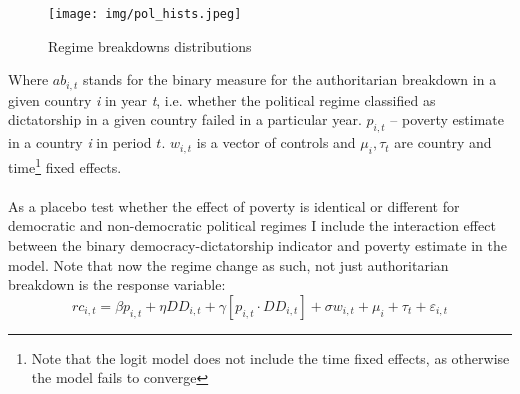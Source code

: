 \documentclass[a4paper, 12pt]{article}
\begin{document}
	\begin{figure}
        \centering
        \texttt{[image: img/pol\_hists.jpeg]}
        \caption{Regime breakdowns distributions}
        \label{fig:pol_hists}
    \end{figure}
	
	\noindent Where $ab_{i,t}$ stands for the binary measure for the authoritarian breakdown in a given country \textit{i} in year \textit{t}, i.e. whether the political regime classified as dictatorship in a given country failed in a particular year. $p_{i,t}$ -- poverty estimate in a country \textit{i} in period $t$. $w_{i,t}$ is a vector of controls and $\mu_i, \tau_t$ are country and time\footnote{Note that the logit model does not include the time fixed effects, as otherwise the model fails to converge} fixed effects.
	\\\\
	\noindent As a placebo test whether the effect of poverty is identical or different for democratic and non-democratic political regimes I include the interaction effect between the binary democracy-dictatorship indicator and poverty estimate in the model. Note that now the regime change as such, not just authoritarian breakdown is the response variable:
	\begin{equation}\label{lpmchange}
	    rc_{i,t} = \beta p_{i,t} + \eta DD_{i,t} + \gamma [p_{i,t} \cdot DD_{i,t}] + \sigma w_{i,t}+\mu_i+\tau_t +\varepsilon_{i,t}
	\end{equation}
\end{document}
